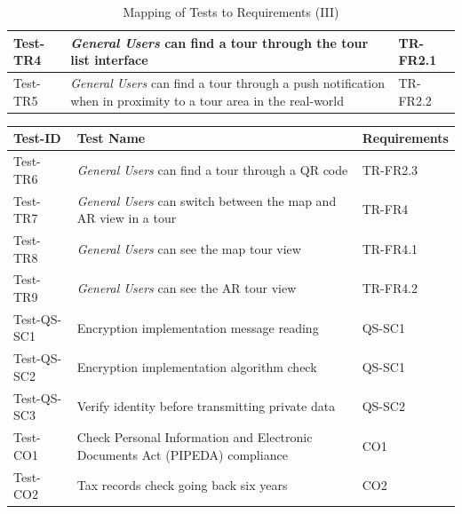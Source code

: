 \documentclass[12pt, titlepage]{article}
\begin{document}
\begin{table}[htpb!]
\begin{tabular}{|l|p{8cm}|p{3cm}|}
    \hline
    Test-TR4         & \textit{General Users} can find a tour through the tour list interface                                                & TR-FR2.1              \\
    \hline
    Test-TR5         & \textit{General Users} can find a tour through a push notification when in proximity to a tour area in the real-world & TR-FR2.2              \\
    \hline
  \end{tabular}
  \caption{Mapping of Tests to Requirements (III)}
  \label{tab:test_requirements3}
\end{table}

\begin{table}[htpb!]
  \centering
  \begin{tabular}{|l|p{8cm}|p{3cm}|}
    \hline
    \textbf{Test-ID} & \textbf{Test Name}                                                          & \textbf{Requirements} \\
    \hline
    Test-TR6         & \textit{General Users} can find a tour through a QR code                    & TR-FR2.3              \\
    \hline
    Test-TR7         & \textit{General Users} can switch between the map and AR view in a tour     & TR-FR4                \\
    \hline
    Test-TR8         & \textit{General Users} can see the map tour view                            & TR-FR4.1              \\
    \hline
    Test-TR9         & \textit{General Users} can see the AR tour view                             & TR-FR4.2              \\
    \hline
    Test-QS-SC1      & Encryption implementation message reading                                   & QS-SC1                \\
    \hline
    Test-QS-SC2      & Encryption implementation algorithm check                                   & QS-SC1                \\
    \hline
    Test-QS-SC3      & Verify identity before transmitting private data                            & QS-SC2                \\
    \hline
    Test-CO1         & Check Personal Information and Electronic Documents Act (PIPEDA) compliance & CO1                   \\
    \hline
    Test-CO2         & Tax records check going back six years                                      & CO2                   \\

\end{tabular}
\end{table}
\end{document}

